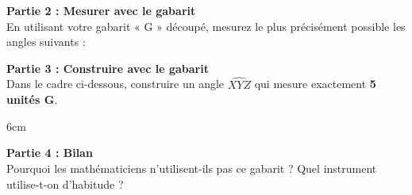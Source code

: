 \documentclass[a4paper]{book}
\begin{document}
    
    \vspace{1cm}
    
    \textbf{Partie 2 : Mesurer avec le gabarit} \\
    En utilisant votre gabarit « G » découpé, mesurez le plus précisément possible les angles suivants :
    
    \begin{center}
    \end{center}
    
    \vspace{2cm}
    
    \textbf{Partie 3 : Construire avec le gabarit} \\
    Dans le cadre ci-dessous, construire un angle $\widehat{XYZ}$ qui mesure exactement \textbf{5 unités G}.
    
    \begin{ZoneReponse}{6cm}
    \end{ZoneReponse}
    
    \bigskip
    
    \textbf{Partie 4 : Bilan} \\
    Pourquoi les mathématiciens n'utilisent-ils pas ce gabarit ? Quel instrument utilise-t-on d'habitude ?
\end{document}
